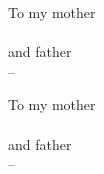 \thispagestyle{empty}

\pagebreak
\hspace{0pt}
\vfill
\begin{center}
\parbox{8cm}{
To my mother \\
\textbf{\firstAuthorMotherName} \\
and father \\
\textbf{\firstAuthorFatherName}
\flushright --\firstAuthor}
\end{center}
\vspace{\baselineskip}
\begin{center}
\parbox{8cm}{
To my mother \\
\textbf{\secondAuthorMotherName} \\
and father \\
\textbf{\secondAuthorFatherName}
\flushright --\secondAuthor}
\end{center}
\vfill
\hspace{0pt}
\pagebreak